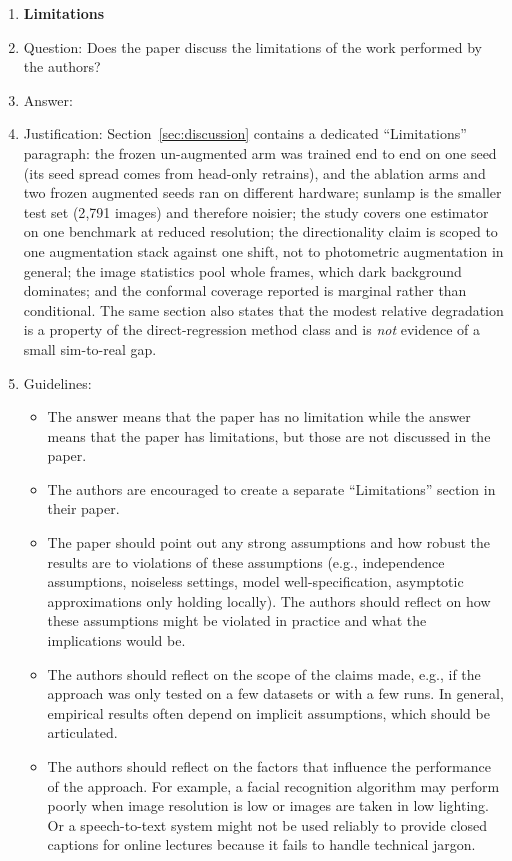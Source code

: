 \begin{enumerate}
\item {\bf Limitations}
    \item[] Question: Does the paper discuss the limitations of the work performed by the authors?
    \item[] Answer: \answerYes{}
    \item[] Justification: Section~\ref{sec:discussion} contains a dedicated ``Limitations'' paragraph: the
    frozen un-augmented arm was trained end to end on one seed (its seed spread comes from head-only
    retrains), and the ablation arms and two frozen augmented seeds ran on different hardware; sunlamp is the smaller test
    set (2{,}791 images) and therefore noisier; the study covers one estimator on one
    benchmark at reduced resolution; the directionality claim is scoped to one augmentation stack against
    one shift, not to photometric augmentation in general; the image statistics pool whole
    frames, which dark background dominates; and
    the conformal coverage reported is marginal rather than conditional. The same section also
    states that the modest relative degradation is a property of the direct-regression method
    class and is \emph{not} evidence of a small sim-to-real gap.
    \item[] Guidelines:
    \begin{itemize}
        \item The answer \answerNA{} means that the paper has no limitation while the answer \answerNo{} means that the paper has limitations, but those are not discussed in the paper. 
        \item The authors are encouraged to create a separate ``Limitations'' section in their paper.
        \item The paper should point out any strong assumptions and how robust the results are to violations of these assumptions (e.g., independence assumptions, noiseless settings, model well-specification, asymptotic approximations only holding locally). The authors should reflect on how these assumptions might be violated in practice and what the implications would be.
        \item The authors should reflect on the scope of the claims made, e.g., if the approach was only tested on a few datasets or with a few runs. In general, empirical results often depend on implicit assumptions, which should be articulated.
        \item The authors should reflect on the factors that influence the performance of the approach. For example, a facial recognition algorithm may perform poorly when image resolution is low or images are taken in low lighting. Or a speech-to-text system might not be used reliably to provide closed captions for online lectures because it fails to handle technical jargon.

\end{itemize}
\end{enumerate}
